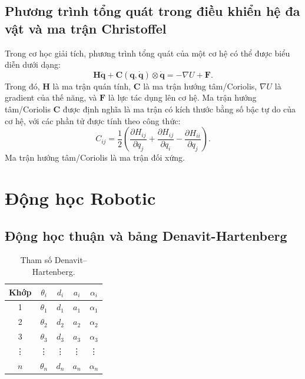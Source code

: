 \subsection{Phương trình tổng quát trong điều khiển hệ đa vật và ma trận Christoffel}

Trong cơ học giải tích, phương trình tổng quát của một cơ hệ có thể được biểu diễn dưới dạng:
\begin{equation}    
    \mathbf{H} \mathbf{\ddot{q}} + \mathbf{C} \left( \mathbf{q}, \mathbf{\dot{q}} \right) \otimes \mathbf{\dot{q}} = -\nabla U + \mathbf{F}.
\end{equation}
Trong đó, \(\mathbf{H}\) là ma trận quán tính, \(\mathbf{C}\) là ma trận hướng tâm/Coriolis, \(\nabla U\) là gradient của thế năng, và \(\mathbf{F}\) là lực tác dụng lên cơ hệ.
Ma trận hướng tâm/Coriolis \(\mathbf{C}\) được định nghĩa là ma trận có kích thước bằng số bậc tự do của cơ hệ, với các phần tử được tính theo công thức:
\begin{equation}
    C_{ij} = \dfrac{1}{2} \left( \dfrac{\partial H_{ij}}{\partial q_j} + \dfrac{\partial H_{ij}}{\partial q_i} - \dfrac{\partial H_{ii}}{\partial q_j} \right). 
\end{equation}
Ma trận hướng tâm/Coriolis là ma trận đối xứng.


\section{Động học Robotic}

\subsection{Động học thuận và bảng Denavit-Hartenberg}

\begin{table}[h]
    \centering
    \caption{Tham số Denavit–Hartenberg.\cite{craig2011introduction}}
    \begin{tabular}{|c|c|c|c|c|}
        \hline
        \textbf{Khớp} & \( \theta_i \) & \( d_i \) & \( a_i \) & \( \alpha_i \) \\
        \hline
        1 & \( \theta_1 \) & \( d_1 \) & \( a_1 \) & \( \alpha_1 \) \\
        \hline
        2 & \( \theta_2 \) & \( d_2 \) & \( a_2 \) & \( \alpha_2 \) \\
        \hline
        3 & \( \theta_3 \) & \( d_3 \) & \( a_3 \) & \( \alpha_3 \) \\
        \hline
        \vdots & \vdots & \vdots & \vdots & \vdots \\
        \hline
        \( n \) & \( \theta_n \) & \( d_n \) & \( a_n \) & \( \alpha_n \) \\
        \hline
    \end{tabular}
\end{table}

